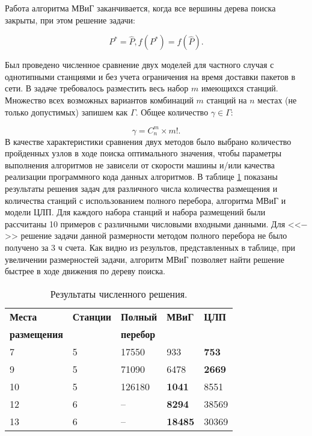 Работа алгоритма МВиГ заканчивается, когда все вершины дерева поиска закрыты, при этом решение задачи: 

\begin{displaymath}
    P^{*} = \widehat{P},  f(P^*) = f(\widehat{P}).
\end{displaymath}

Был проведено численное сравнение двух моделей для частного случая с однотипными станциями и без учета ограничения на время доставки пакетов в сети. В задаче требовалось разместить весь набор $m$ имеющихся станций. Множество всех возможных вариантов комбинаций $m$ станций на  $n$ местах (не только допустимых) запишем как $\Gamma$. Общее количество $\gamma \in \Gamma$:

\begin{displaymath}
\gamma = C_n^m \times m!.
\end{displaymath} 
 В качестве характеристики сравнения двух методов было выбрано количество пройденных узлов в ходе поиска оптимального значения, чтобы параметры выполнения алгоритмов не зависели от скорости машины и/или качества реализации программного кода данных алгоритмов. В таблице \cref{tab:problems_BF_BnB_ILP} показаны результаты решения задач для различного числа количества размещения и количества станций с использованием полного перебора, алгоритма МВиГ и модели ЦЛП. Для каждого набора станций и набора размещений были рассчитаны 10 примеров с различными числовыми входными данными. Для <<$-$>> решение задачи данной размерности методом полного перебора не было получено за 3 ч счета. 
Как видно из результов, представленных в таблице, при увеличении размерностей задачи, алгоритм МВиГ позволяет найти решение быстрее в ходе движения по дереву поиска.

\begin{table}[b]\centering
    \caption{Результаты численного решения.}\label{tab:problems_BF_BnB_ILP}
    \begin{tabular}{|l|l|l|l|l|}
    \hline
    \textbf{Места} & \textbf{Станции} &	\textbf{Полный}& \textbf{МВиГ} & \textbf{ЦЛП} \\ 
    \textbf{размещения} &  &	\textbf{перебор}&  &  \\
    \hline
    7 &		5 &	17550  &	933 &		\textbf{753}\\
    9 &		5 &	71090  &	6478 &		\textbf{2669}\\
    10 &	5 &	126180 &	\textbf{1041} &		8551\\
    12 &	6 &	-- &		\textbf{8294} &		38569\\
    13 & 	6 &	-- &		\textbf{18485} &	30369\\
    \hline
    \end{tabular}
\end{table}
    


